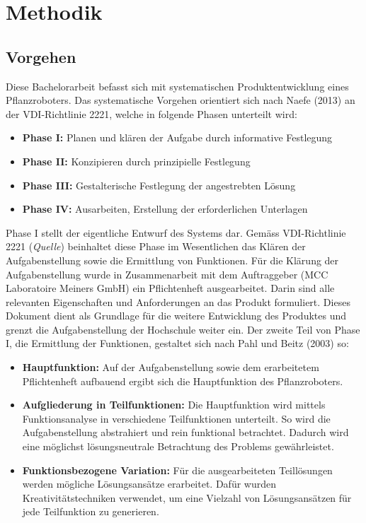 \newpage
\section{Methodik}
\subsection{Vorgehen}
Diese Bachelorarbeit befasst sich mit systematischen Produktentwicklung eines Pflanzroboters. Das systematische Vorgehen orientiert sich nach Naefe (2013) an der VDI-Richtlinie 2221, welche in folgende Phasen unterteilt wird:

\begin{itemize}
	\item \textbf{Phase I:} Planen und klären der Aufgabe durch informative Festlegung
	
	\item \textbf{Phase II:} Konzipieren durch prinzipielle Festlegung
	
	\item \textbf{Phase III:} Gestalterische Festlegung der angestrebten Lösung
	
	\item \textbf{Phase IV:} Ausarbeiten, Erstellung der erforderlichen Unterlagen
	
\end{itemize}

Phase I stellt der eigentliche Entwurf des Systems dar. Gemäss VDI-Richtlinie 2221 (\textit{Quelle}) beinhaltet diese Phase im Wesentlichen das Klären der Aufgabenstellung sowie die Ermittlung von Funktionen. Für die Klärung der Aufgabenstellung wurde in Zusammenarbeit mit dem Auftraggeber (MCC Laboratoire Meiners GmbH) ein Pflichtenheft ausgearbeitet. Darin sind alle relevanten Eigenschaften und Anforderungen an das Produkt formuliert. Dieses Dokument dient als Grundlage für die weitere Entwicklung des Produktes und grenzt die Aufgabenstellung der Hochschule weiter ein. Der zweite Teil von Phase I, die Ermittlung der Funktionen, gestaltet sich nach Pahl und Beitz (2003) so:

\begin{itemize}
	\item \textbf{Hauptfunktion:} Auf der Aufgabenstellung sowie dem erarbeitetem Pflichtenheft aufbauend ergibt sich die Hauptfunktion des Pflanzroboters.
	
	\item \textbf{Aufgliederung in Teilfunktionen:} Die Hauptfunktion wird mittels Funktionsanalyse in verschiedene Teilfunktionen unterteilt. So wird die Aufgabenstellung abstrahiert und rein funktional betrachtet. Dadurch wird eine möglichst lösungsneutrale Betrachtung des Problems gewährleistet. 
	
	\item \textbf{Funktionsbezogene Variation:} Für die ausgearbeiteten Teillösungen werden mögliche Lösungsansätze erarbeitet. Dafür wurden Kreativitätstechniken verwendet, um eine Vielzahl von Lösungsansätzen für jede Teilfunktion zu generieren.

\end{itemize}

